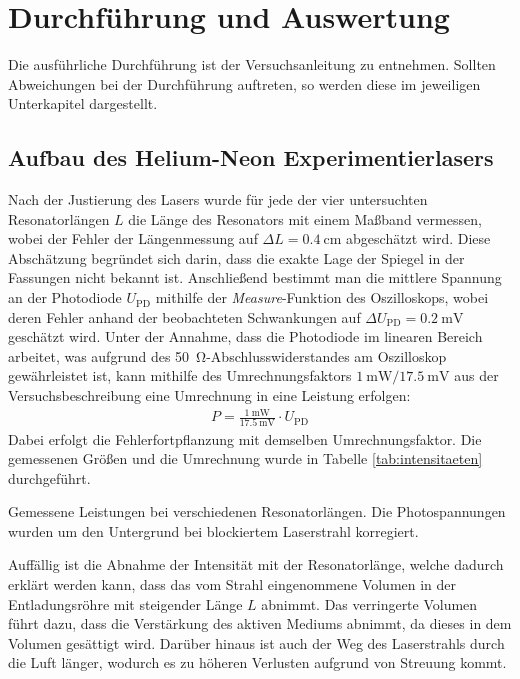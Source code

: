 \documentclass[11pt, a4paper]{article}
\numberwithin{equation}{section}
\begin{document}
\section{Durchführung und Auswertung}
Die ausführliche Durchführung ist der Versuchsanleitung \cite{anleitung} zu entnehmen.
Sollten Abweichungen bei der Durchführung auftreten, so werden diese im jeweiligen Unterkapitel dargestellt.

\subsection{Aufbau des Helium-Neon Experimentierlasers}
Nach der Justierung des Lasers wurde für jede der vier untersuchten Resonatorlängen $L$ die Länge des Resonators mit einem Maßband vermessen, wobei der Fehler der Längenmessung auf $\Delta L = \SI{0.4}{\centi\metre}$ abgeschätzt wird.
Diese Abschätzung begründet sich darin, dass die exakte Lage der Spiegel in der Fassungen nicht bekannt ist.
Anschließend bestimmt man die mittlere Spannung an der Photodiode $U_\mathrm{PD}$ mithilfe der \textit{Measure}-Funktion des Oszilloskops, wobei deren Fehler anhand der beobachteten Schwankungen auf $\Delta U_\mathrm{PD} = \SI{0.2}{\milli\volt}$ geschätzt wird.
Unter der Annahme, dass die Photodiode im linearen Bereich arbeitet, was aufgrund des \SI{50}{\ohm}-Abschlusswiderstandes am Oszilloskop gewährleistet ist, kann mithilfe des Umrechnungsfaktors $\SI{1}{\milli\watt} / \SI{17.5}{\milli\volt}$ aus der Versuchsbeschreibung \cite{anleitung} eine Umrechnung in eine Leistung erfolgen:
\begin{align}
	P = \frac{\SI{1}{\milli\watt}}{\SI{17.5}{\milli\volt}} \cdot U_\mathrm{PD}
	\label{eq:umrechnung_watt}
\end{align}
Dabei erfolgt die Fehlerfortpflanzung mit demselben Umrechnungsfaktor.
Die gemessenen Größen und die Umrechnung wurde in Tabelle \ref{tab:intensitaeten} durchgeführt.
\begin{table}[h]
	\centering
	
	\caption{Gemessene Leistungen bei verschiedenen Resonatorlängen. Die Photospannungen wurden um den Untergrund bei blockiertem Laserstrahl korregiert.}
	\label{tab:intensitaeten}
\end{table}
Auffällig ist die Abnahme der Intensität mit der Resonatorlänge, welche dadurch erklärt werden kann, dass das vom Strahl eingenommene Volumen in der Entladungsröhre mit steigender Länge $L$ abnimmt.
Das verringerte Volumen führt dazu, dass die Verstärkung des aktiven Mediums abnimmt, da dieses in dem Volumen gesättigt wird.
Darüber hinaus ist auch der Weg des Laserstrahls durch die Luft länger, wodurch es zu höheren Verlusten aufgrund von Streuung kommt.
\end{document}
